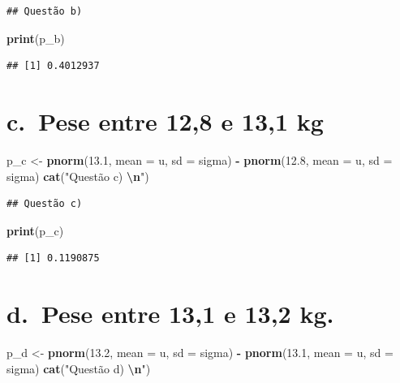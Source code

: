 \documentclass[
]{article}
\newenvironment{Shaded}{\begin{snugshade}}{\end{snugshade}}
\newcommand{\AttributeTok}[1]{\textcolor[rgb]{0.13,0.29,0.53}{#1}}
\newcommand{\FloatTok}[1]{\textcolor[rgb]{0.00,0.00,0.81}{#1}}
\newcommand{\FunctionTok}[1]{\textcolor[rgb]{0.13,0.29,0.53}{\textbf{#1}}}
\newcommand{\NormalTok}[1]{#1}
\newcommand{\OtherTok}[1]{\textcolor[rgb]{0.56,0.35,0.01}{#1}}
\newcommand{\SpecialCharTok}[1]{\textcolor[rgb]{0.81,0.36,0.00}{\textbf{#1}}}
\newcommand{\StringTok}[1]{\textcolor[rgb]{0.31,0.60,0.02}{#1}}
\begin{document}
\begin{verbatim}
## Questão b)
\end{verbatim}

\begin{Shaded}
\begin{Highlighting}[]
\FunctionTok{print}\NormalTok{(p\_b)}
\end{Highlighting}
\end{Shaded}

\begin{verbatim}
## [1] 0.4012937
\end{verbatim}

\section{c.~Pese entre 12,8 e 13,1 kg}\label{c.-pese-entre-128-e-131-kg}

\begin{Shaded}
\begin{Highlighting}[]
\NormalTok{p\_c }\OtherTok{\textless{}{-}} \FunctionTok{pnorm}\NormalTok{(}\FloatTok{13.1}\NormalTok{, }\AttributeTok{mean =}\NormalTok{ u, }\AttributeTok{sd =}\NormalTok{ sigma) }\SpecialCharTok{{-}} \FunctionTok{pnorm}\NormalTok{(}\FloatTok{12.8}\NormalTok{, }\AttributeTok{mean =}\NormalTok{ u, }\AttributeTok{sd =}\NormalTok{ sigma)}
\FunctionTok{cat}\NormalTok{(}\StringTok{"Questão c) }\SpecialCharTok{\textbackslash{}n}\StringTok{"}\NormalTok{)}
\end{Highlighting}
\end{Shaded}

\begin{verbatim}
## Questão c)
\end{verbatim}

\begin{Shaded}
\begin{Highlighting}[]
\FunctionTok{print}\NormalTok{(p\_c)}
\end{Highlighting}
\end{Shaded}

\begin{verbatim}
## [1] 0.1190875
\end{verbatim}

\section{d.~Pese entre 13,1 e 13,2
kg.}\label{d.-pese-entre-131-e-132-kg.}

\begin{Shaded}
\begin{Highlighting}[]
\NormalTok{p\_d }\OtherTok{\textless{}{-}} \FunctionTok{pnorm}\NormalTok{(}\FloatTok{13.2}\NormalTok{, }\AttributeTok{mean =}\NormalTok{ u, }\AttributeTok{sd =}\NormalTok{ sigma) }\SpecialCharTok{{-}} \FunctionTok{pnorm}\NormalTok{(}\FloatTok{13.1}\NormalTok{, }\AttributeTok{mean =}\NormalTok{ u, }\AttributeTok{sd =}\NormalTok{ sigma)}
\FunctionTok{cat}\NormalTok{(}\StringTok{"Questão d) }\SpecialCharTok{\textbackslash{}n}\StringTok{"}\NormalTok{)}
\end{Highlighting}
\end{Shaded}
\end{document}
